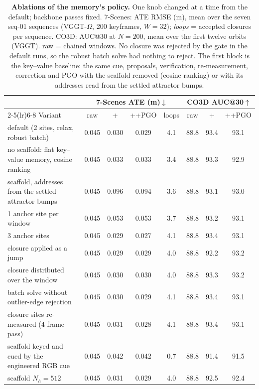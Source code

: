 \begin{table}[t]
\centering\scriptsize\setlength{\tabcolsep}{4pt}
\caption{\textbf{Ablations of the memory's policy.} One knob changed at a time from the default; backbone passes fixed. 7-Scenes: ATE RMSE (m), mean over the seven seq-01 sequences (VGGT-$\Omega$, 200 keyframes, $W{=}32$); \emph{loops} = accepted closures per sequence. CO3D: AUC@30 at $N{=}200$, mean over the first twelve orbits (VGGT). raw = chained windows. No closure was rejected by the gate in the default runs, so the robust batch solve had nothing to reject. The first block is the key--value baseline: the same cue, proposals, verification, re-measurement, correction and PGO with the scaffold removed (cosine ranking) or with its addresses read from the settled attractor bumps.}
\label{tab:ablation}
\begin{tabular}{@{}l ccc c ccc@{}}
\toprule
& \multicolumn{4}{c}{7-Scenes ATE (m)$\downarrow$} & \multicolumn{3}{c}{CO3D AUC@30$\uparrow$} \\
\cmidrule(lr){2-5}\cmidrule(lr){6-8}
Variant & raw & +\smr{} & +\smr{}+PGO & loops & raw & +\smr{} & +\smr{}+PGO \\
\midrule
default (2 sites, relax, robust batch) & 0.045 & 0.030 & 0.029 & 4.1 & 88.8 & 93.4 & 93.1 \\
no scaffold: flat key--value memory, cosine ranking & 0.045 & 0.033 & 0.033 & 3.4 & 88.8 & 93.3 & 92.9 \\
scaffold, addresses from the settled attractor bumps & 0.045 & 0.096 & 0.094 & 3.6 & 88.8 & 93.1 & 93.0 \\
\midrule
1 anchor site per window & 0.045 & 0.053 & 0.053 & 3.7 & 88.8 & 93.2 & 93.1 \\
3 anchor sites & 0.045 & 0.029 & 0.027 & 4.1 & 88.8 & 93.4 & 93.1 \\
closure applied as a jump & 0.045 & 0.029 & 0.029 & 4.0 & 88.8 & 92.2 & 93.2 \\
closure distributed over the window & 0.045 & 0.030 & 0.030 & 4.0 & 88.8 & 93.3 & 93.2 \\
batch solve without outlier-edge rejection & 0.045 & 0.030 & 0.029 & 4.1 & 88.8 & 93.4 & 93.1 \\
closure sites re-measured (4-frame pass) & 0.045 & 0.031 & 0.028 & 4.1 & 88.8 & 93.4 & 93.1 \\
scaffold keyed and cued by the engineered RGB cue & 0.045 & 0.042 & 0.042 & 0.7 & 88.8 & 91.4 & 91.5 \\
scaffold $N_h{=}512$ & 0.045 & 0.031 & 0.029 & 4.0 & 88.8 & 92.5 & 92.4 \\

\end{tabular}
\end{table}
